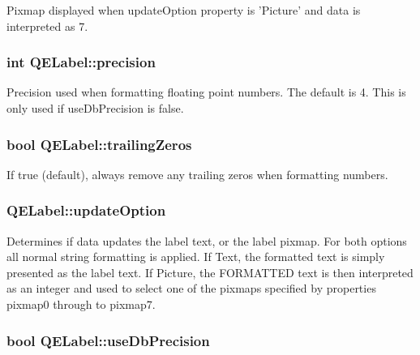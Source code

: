 \label{classQELabel_a65da0ef3bc0c5f289070763c7c794e77}
Pixmap displayed when updateOption property is 'Picture' and data is interpreted as 7. \hypertarget{classQELabel_ae2c883aef3dc155fe5d7b9738196b407}{
\subsubsection[{precision}]{\setlength{\rightskip}{0pt plus 5cm}int QELabel::precision}}
\label{classQELabel_ae2c883aef3dc155fe5d7b9738196b407}
Precision used when formatting floating point numbers. The default is 4. This is only used if useDbPrecision is false. \hypertarget{classQELabel_a7f1da93667a65a3a3f72ca0bd15449f5}{
\subsubsection[{trailingZeros}]{\setlength{\rightskip}{0pt plus 5cm}bool QELabel::trailingZeros}}
\label{classQELabel_a7f1da93667a65a3a3f72ca0bd15449f5}
If true (default), always remove any trailing zeros when formatting numbers. \hypertarget{classQELabel_a04d0f5e68531f66b82661f928b2e6dc9}{
\subsubsection[{updateOption}]{ QELabel::updateOption}}
\label{classQELabel_a04d0f5e68531f66b82661f928b2e6dc9}
Determines if data updates the label text, or the label pixmap. For both options all normal string formatting is applied. If Text, the formatted text is simply presented as the label text. If Picture, the FORMATTED text is then interpreted as an integer and used to select one of the pixmaps specified by properties pixmap0 through to pixmap7. \hypertarget{classQELabel_adcb309f27891b269748544992008af59}{
\subsubsection[{useDbPrecision}]{\setlength{\rightskip}{0pt plus 5cm}bool QELabel::useDbPrecision}}
